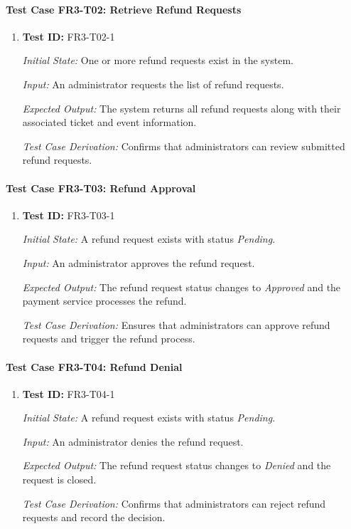 \documentclass[12pt, titlepage]{article}
\begin{document}
\paragraph{Test Case FR3-T02: Retrieve Refund Requests}

\begin{enumerate}

\item \textbf{Test ID:} FR3-T02-1

\textit{Initial State:} One or more refund requests exist in the system.

\textit{Input:} An administrator requests the list of refund requests.

\textit{Expected Output:} The system returns all refund requests along with their associated ticket and event information.

\textit{Test Case Derivation:} Confirms that administrators can review submitted refund requests.

\end{enumerate}


\paragraph{Test Case FR3-T03: Refund Approval}

\begin{enumerate}

\item \textbf{Test ID:} FR3-T03-1

\textit{Initial State:} A refund request exists with status \textit{Pending}.

\textit{Input:} An administrator approves the refund request.

\textit{Expected Output:} The refund request status changes to \textit{Approved} and the payment service processes the refund.

\textit{Test Case Derivation:} Ensures that administrators can approve refund requests and trigger the refund process.

\end{enumerate}


\paragraph{Test Case FR3-T04: Refund Denial}

\begin{enumerate}

\item \textbf{Test ID:} FR3-T04-1

\textit{Initial State:} A refund request exists with status \textit{Pending}.

\textit{Input:} An administrator denies the refund request.

\textit{Expected Output:} The refund request status changes to \textit{Denied} and the request is closed.

\textit{Test Case Derivation:} Confirms that administrators can reject refund requests and record the decision.

\end{enumerate}
\end{document}
